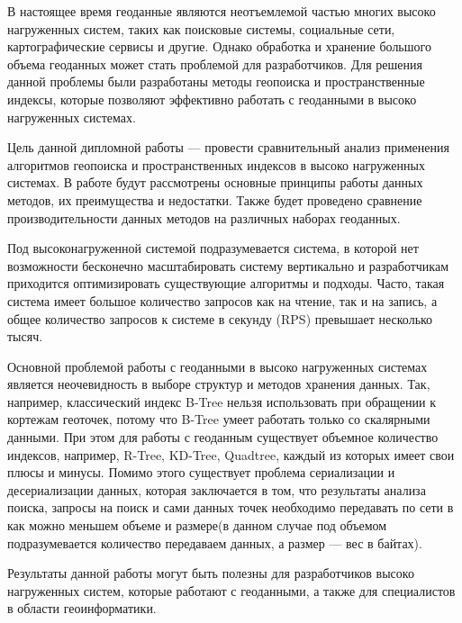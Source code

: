 \Introduction

В настоящее время геоданные являются неотъемлемой частью многих высоко нагруженных систем, таких как поисковые системы, социальные сети, картографические сервисы и другие. Однако обработка и хранение большого объема геоданных может стать проблемой для разработчиков. Для решения данной проблемы были разработаны методы геопоиска и пространственные индексы, которые позволяют эффективно работать с геоданными в высоко нагруженных системах.

Цель данной дипломной работы — провести сравнительный анализ применения алгоритмов геопоиска и пространственных индексов в высоко нагруженных системах. В работе будут рассмотрены основные принципы работы данных методов, их преимущества и недостатки. Также будет проведено сравнение производительности данных методов на различных наборах геоданных.

Под высоконагруженной системой подразумевается система, в которой нет возможности бесконечно масштабировать систему вертикально и разработчикам приходится оптимизировать существующие алгоритмы и подходы. Часто, такая система имеет большое количество запросов как на чтение, так и на запись, а общее количество запросов к системе в секунду (RPS) превышает несколько тысяч. 

Основной проблемой работы с геоданными в высоко нагруженных системах является неочевидность в выборе структур и методов хранения данных. Так, например, классический индекс B-Tree нельзя использовать при обращении к кортежам геоточек, потому что B-Tree умеет работать только со скалярными данными. При этом для работы с геоданным существует объемное количество индексов, например, R-Tree, KD-Tree, Quadtree, каждый из которых имеет свои плюсы и минусы. Помимо этого существует проблема сериализации и десериализации данных, которая заключается в том, что результаты анализа поиска, запросы на поиск и сами данных точек необходимо передавать по сети в как можно меньшем объеме и размере(в данном случае под объемом подразумевается количество передаваем данных, а размер — вес в байтах).

Результаты данной работы могут быть полезны для разработчиков высоко нагруженных систем, которые работают с геоданными, а также для специалистов в области геоинформатики.

